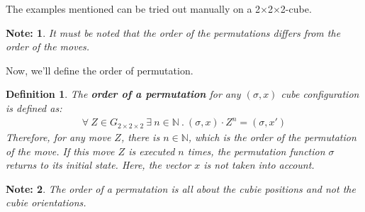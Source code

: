\documentclass[12pt,a4paper]{article}
\theoremstyle{custom}
\newtheorem*{definition}{Definition}
\newtheorem*{note}{Note:}
\newcommand{\Gtwo}{\ensuremath{G_{2\times 2\times 2}}}
\newcommand{\Ttwo}{2$\times$2$\times$2-}
\begin{document}
The examples mentioned can be tried out manually on a \Ttwo cube.
\begin{note}
It must be noted that the order of the permutations differs from the order of the moves.
\end{note}

Now, we'll define the order of permutation. 
\begin{definition}
    

  
The \textbf{order of a permutation} for any $(\sigma, x)$ cube configuration is defined as: 
\begin{align*}
\forall \ Z \in \Gtwo \ \exists \ n \in \mathbb{N} \ . \ (\sigma, x) \cdot Z^n = (\sigma, x')
\end{align*}
Therefore, for any move $Z$, there is $n \in \mathbb{N}$, which is the order of the permutation of the move. If this move $Z$ is executed $n$ times, the permutation function $\sigma$ returns to its initial state. Here, the vector $x$ is not taken into account.
\end{definition}
\begin{note}
    The order of a permutation is all about the cubie positions and not the cubie orientations.
\end{note}
\end{document}
